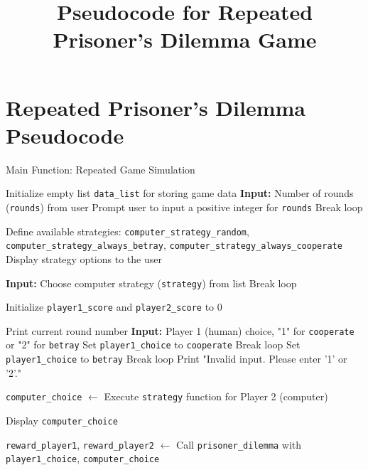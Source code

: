 \documentclass{article}
\begin{document}
\title{Pseudocode for Repeated Prisoner's Dilemma Game}
\author{}
\date{}
\maketitle

\section*{Repeated Prisoner's Dilemma Pseudocode}

\begin{algorithm}[H]
\caption{Main Function: Repeated Game Simulation}
\begin{algorithmic}[1]
\STATE Initialize empty list \texttt{data\_list} for storing game data
\STATE \textbf{Input:} Number of rounds (\texttt{rounds}) from user
    \STATE Prompt user to input a positive integer for \texttt{rounds}
        \STATE Break loop
    \ENDIF
\ENDWHILE

\STATE Define available strategies: \texttt{computer\_strategy\_random}, \texttt{computer\_strategy\_always\_betray}, \texttt{computer\_strategy\_always\_cooperate}
\STATE Display strategy options to the user

    \STATE \textbf{Input:} Choose computer strategy (\texttt{strategy}) from list
        \STATE Break loop
    \ENDIF
\ENDWHILE

\STATE Initialize \texttt{player1\_score} and \texttt{player2\_score} to 0

    \STATE Print current round number
        \STATE \textbf{Input:} Player 1 (human) choice, "1" for \texttt{cooperate} or "2" for \texttt{betray}
            \STATE Set \texttt{player1\_choice} to \texttt{cooperate}
            \STATE Break loop
            \STATE Set \texttt{player1\_choice} to \texttt{betray}
            \STATE Break loop
        \ELSE
            \STATE Print "Invalid input. Please enter '1' or '2'."
        \ENDIF
    \ENDWHILE

    \STATE \texttt{computer\_choice} $\gets$ Execute \texttt{strategy} function for Player 2 (computer)

    \STATE Display \texttt{computer\_choice}

    \STATE \texttt{reward\_player1}, \texttt{reward\_player2} $\gets$ Call \texttt{prisoner\_dilemma} with \texttt{player1\_choice}, \texttt{computer\_choice}


\end{algorithmic}
\end{algorithm}
\end{document}
